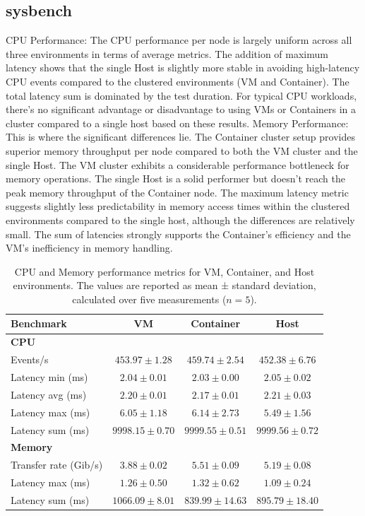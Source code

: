 \subsection{sysbench}
CPU Performance: The CPU performance per node is largely uniform across all three environments in terms of average metrics. The addition of maximum latency shows that the single Host is slightly more stable in avoiding high-latency CPU events compared to the clustered environments (VM and Container). The total latency sum is dominated by the test duration. For typical CPU workloads, there's no significant advantage or disadvantage to using VMs or Containers in a cluster compared to a single host based on these results.
Memory Performance: This is where the significant differences lie. The Container cluster setup provides superior memory throughput per node compared to both the VM cluster and the single Host. The VM cluster exhibits a considerable performance bottleneck for memory operations. The single Host is a solid performer but doesn't reach the peak memory throughput of the Container node. The maximum latency metric suggests slightly less predictability in memory access times within the clustered environments compared to the single host, although the differences are relatively small. The sum of latencies strongly supports the Container's efficiency and the VM's inefficiency in memory handling.

\begin{table}[H]
    \centering
    \begin{tabular}{lccc}
    \toprule
    \textbf{Benchmark} & \textbf{VM} & \textbf{Container} & \textbf{Host} \\
    \midrule
    \textbf{CPU} & & & \\
    Events/s & $453.97 \pm 1.28$ & $459.74 \pm 2.54$ & $452.38 \pm 6.76$ \\
    Latency min (ms) & $2.04 \pm 0.01$ & $2.03 \pm 0.00$ & $2.05 \pm 0.02$ \\
    Latency avg (ms) & $2.20 \pm 0.01$ & $2.17 \pm 0.01$ & $2.21 \pm 0.03$ \\
    Latency max (ms) & $6.05 \pm 1.18$ & $6.14 \pm 2.73$ & $5.49 \pm 1.56$ \\
    Latency sum (ms) & $9998.15 \pm 0.70$ & $9999.55 \pm 0.51$ & $9999.56 \pm 0.72$ \\
    \midrule
    \textbf{Memory} & & & \\
    Transfer rate (Gib/s) & $3.88 \pm 0.02$ & $5.51 \pm 0.09$ & $5.19 \pm 0.08$ \\
    Latency max (ms) & $1.26 \pm 0.50$ & $1.32 \pm 0.62$ & $1.09 \pm 0.24$ \\
    Latency sum (ms) & $1066.09 \pm 8.01$ & $839.99 \pm 14.63$ & $895.79 \pm 18.40$ \\
    \bottomrule

    \end{tabular}
    \caption{CPU and Memory performance metrics for VM, Container, and Host environments. The values are reported as mean ± standard deviation, calculated over five measurements ($n = 5$).}
    \label{tab:sysbench}
\end{table}


